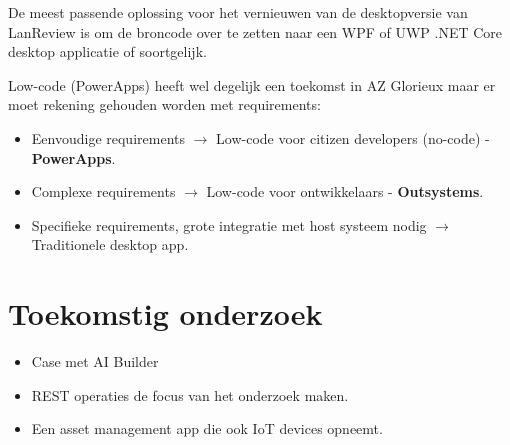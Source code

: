 \documentclass[a0,portrait]{a0poster}
\begin{document}
\begin{multicols}{2}
De meest passende oplossing voor het vernieuwen van de desktopversie van LanReview is om de broncode over te zetten naar een WPF of UWP .NET Core desktop applicatie of soortgelijk. 

\vspace{1cm}

Low-code (PowerApps) heeft wel degelijk een toekomst in AZ Glorieux maar er moet rekening gehouden worden met requirements:
\begin{itemize}
    \item Eenvoudige requirements $\rightarrow$ Low-code voor citizen developers (no-code) - \textbf{PowerApps}.
    \item Complexe requirements $\rightarrow$ Low-code voor ontwikkelaars - \textbf{Outsystems}.
    \item Specifieke requirements, grote integratie met host systeem nodig $\rightarrow$ Traditionele desktop app.
\end{itemize}
\color{HoGentAccent1} 
\section*{Toekomstig onderzoek}
\color{black}

\begin{itemize}
    \item Case met AI Builder
    \item REST operaties de focus van het onderzoek maken.
    \item Een asset management app die ook IoT devices opneemt.
\end{itemize}



\end{multicols}
\end{document}
